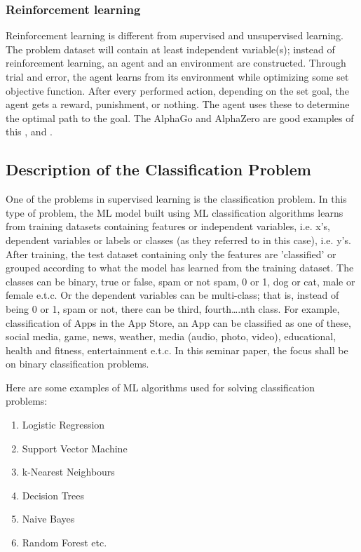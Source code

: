 \documentclass[conference]{IEEEtran}
\begin{document}
\subsubsection{Reinforcement learning}
Reinforcement learning is different from supervised and unsupervised learning. The problem dataset will contain at least independent variable(s); instead of reinforcement learning, an agent and an environment are constructed. Through trial and error, the agent learns from its environment while optimizing some set objective function. After every performed action, depending on the set goal, the agent gets a reward, punishment, or nothing. The agent uses these to determine the optimal path to the goal. The AlphaGo and AlphaZero are good examples of this \cite{bb3}, and \cite{bb5}.

\subsection{Description of the Classification Problem}
One of the problems in supervised learning is the classification problem. In this type of problem, the ML model built using ML classification algorithms learns from training datasets containing features or independent variables, i.e. x's, dependent variables or labels or classes (as they referred to in this case), i.e. y's. After training, the test dataset containing only the features are 'classified' or grouped according to what the model has learned from the training dataset. The classes can be binary, true or false, spam or not spam, 0 or 1, dog or cat, male or female e.t.c. Or the dependent variables can be multi-class; that is, instead of being 0 or 1, spam or not, there can be third, fourth….nth class. For example, classification of Apps in the App Store, an App can be classified as one of these, social media, game, news, weather, media (audio, photo, video), educational, health and fitness, entertainment e.t.c. In this seminar paper, the focus shall be on binary classification problems.


Here are some examples of ML algorithms used for solving classification problems:
\begin{enumerate}
\item Logistic Regression
\item Support Vector Machine
\item k-Nearest Neighbours
\item Decision Trees
\item Naive Bayes
\item Random Forest etc.
\end{enumerate}
\end{document}
